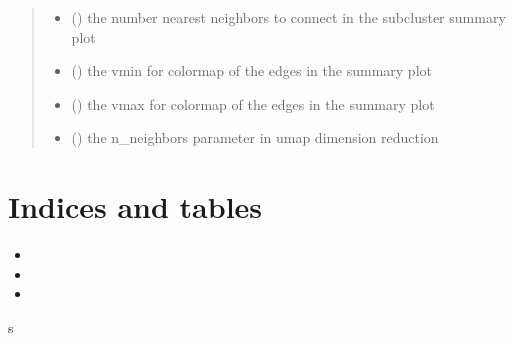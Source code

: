 \documentclass[letterpaper,10pt,english]{sphinxmanual}
\begin{document}
\begin{fulllineitems}
\begin{fulllineitems}
\begin{quote}
\begin{description}
\begin{itemize}
\item {} 
 () \textendash{} the number nearest neighbors to connect in the subcluster summary plot

\item {} 
 () \textendash{} the vmin for colormap of the edges in the summary plot

\item {} 
 () \textendash{} the vmax for colormap of the edges in the summary plot

\item {} 
 () \textendash{} the n\_neighbors parameter in umap dimension reduction

\end{itemize}

\end{description}\end{quote}

\end{fulllineitems}


\end{fulllineitems}



\chapter{Indices and tables}
\label{\detokenize{index:indices-and-tables}}\begin{itemize}
\item {} 

\item {} 

\item {} 

\end{itemize}


\renewcommand{\indexname}{Python Module Index}
\begin{sphinxtheindex}
\def\bigletter#1{{\Large\sffamily#1}\nopagebreak\vspace{1mm}}
\bigletter{s}
\item {}
\item {}
\end{sphinxtheindex}

\renewcommand{\indexname}{Index}
\printindex
\end{document}
